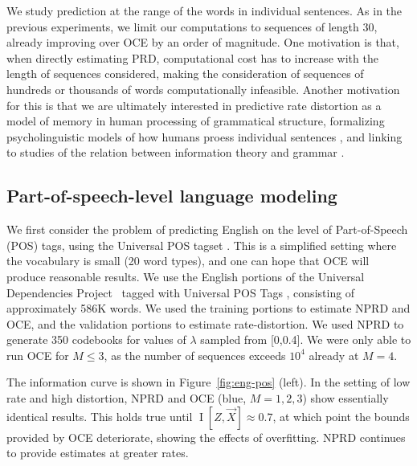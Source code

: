 \documentclass[entropy,article,submit,moreauthors,pdftex,10pt,a4paper]{Definitions/mdpi}
\newcommand{\future}{\overrightarrow{X}}
\begin{document}

We study prediction at the range of the words in individual sentences.
As in the previous experiments, we limit our computations to sequences of length 30, already improving over OCE by an order of magnitude.
One motivation is that, when directly estimating PRD, computational cost has to increase with the length of sequences considered, making the consideration of sequences of hundreds or thousands of words computationally infeasible.
Another motivation for this is that we are ultimately interested in predictive rate distortion as a model of memory in human processing of grammatical structure, formalizing psycholinguistic models of how humans proess individual sentences \citep{gibson-linguistic-1998,futrell-noisy-context-2017}, and linking to studies of the relation between information theory and grammar \citep{koplenig2017statistical}.





\subsection{Part-of-speech-level language modeling}\label{sec:pos}

We first consider the problem of predicting English on the level of Part-of-Speech (POS) tags, using the Universal POS tagset \citep{petrov-universal-2012}. 
This is a simplified setting where the vocabulary is small (20 word types), and one can hope that OCE will produce reasonable results.
We use the English portions of the Universal Dependencies Project~\citep{nivre-universal-2017} tagged with Universal POS Tags \citep{petrov-universal-2012}, consisting of approximately 586K words.
We used the training portions to estimate NPRD and OCE, and the validation portions to estimate rate-distortion.
We used NPRD to generate 350 codebooks for values of $\lambda$ sampled from [0,0.4].
We were only able to run OCE for $M \leq 3$, as the number of sequences exceeds $10^4$ already at $M=4$.


The information curve is shown in Figure~\ref{fig:eng-pos} (left).
In the setting of low rate and high distortion, NPRD and OCE (blue, $M=1,2,3$) show essentially identical results.
This holds true until $\operatorname{I}[Z, \future] \approx 0.7$, at which point the bounds provided by OCE deteriorate, showing the effects of overfitting.
NPRD continues to provide estimates at greater rates.
\end{document}
